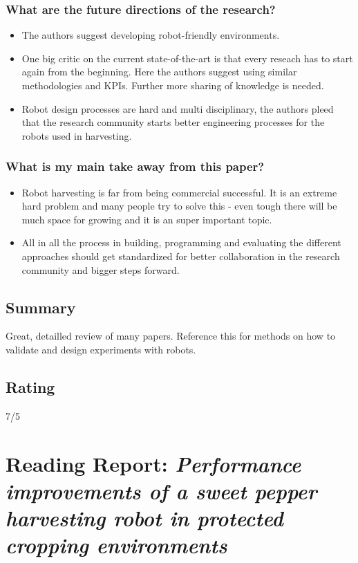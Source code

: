 \documentclass{article}
\begin{document}
\subsubsection*{What are the future directions of the research?}
\begin{itemize}
    \item The authors suggest developing robot-friendly environments.
    \item One big critic on the current state-of-the-art is that every reseach has to start again from the beginning. Here the authors suggest using similar methodologies and KPIs. Further more sharing of knowledge is needed.
    \item Robot design processes are hard and multi disciplinary, the authors pleed that the research community starts better engineering processes for the robots used in harvesting. 
\end{itemize}
\subsubsection*{What is my main take away from this paper?}
\begin{itemize}
    \item Robot harvesting is far from being commercial successful. It is an extreme hard problem and many people try to solve this - even tough there will be much space for growing and it is an super important topic.
    \item All in all the process in building, programming and evaluating the different approaches should get standardized for better collaboration in the research community and bigger steps forward.
\end{itemize}

\subsection*{Summary}
Great, detailled review of many papers. Reference this for methods on how to validate and design experiments with robots.
\subsection*{Rating}
7/5


\section{Reading Report: \emph{Performance improvements of a sweet pepper harvesting robot in protected cropping environments
}}
\cite{Lehnert2020}
\end{document}
